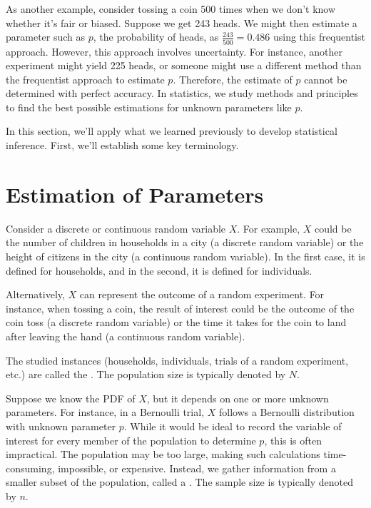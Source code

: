 As another example, consider tossing a coin 500 times when we don't know whether it's fair or biased.
Suppose we get 243 heads.
We might then estimate a parameter such as \( p \), the probability of heads, as \( \frac{243}{500} = 0.486 \) using this frequentist approach.
However, this approach involves uncertainty.
For instance, another experiment might yield 225 heads, or someone might use a different method than the frequentist approach to estimate \( p \).
Therefore, the estimate of \( p \) cannot be determined with perfect accuracy.
In statistics, we study methods and principles to find the best possible estimations for unknown parameters like \( p \).

In this section, we'll apply what we learned previously to develop statistical inference.
First, we'll establish some key terminology.

\section{Estimation of Parameters}

Consider a discrete or continuous random variable  \( X \).
For example, \( X \) could be the number of children in households in a city (a discrete random variable) or the height of citizens in the city (a continuous random variable).
In the first case, it is defined for households, and in the second, it is defined for individuals.

Alternatively, \( X \) can represent the outcome of a random experiment.
For instance, when tossing a coin, the result of interest could be the outcome of the coin toss (a discrete random variable) or the time it takes for the coin to land after leaving the hand (a continuous random variable).

The studied instances (households, individuals, trials of a random experiment, etc.) are called the .
The population size is typically denoted by \( N \).

Suppose we know the PDF of \( X \), but it depends on one or more unknown parameters.
For instance, in a Bernoulli trial, \( X \) follows a Bernoulli distribution with unknown parameter \( p \).
While it would be ideal to record the variable of interest for every member of the population to determine \( p \), this is often impractical.
The population may be too large, making such calculations time-consuming, impossible, or expensive.
Instead, we gather information from a smaller subset of the population, called a .
The sample size is typically denoted by \( n \).

